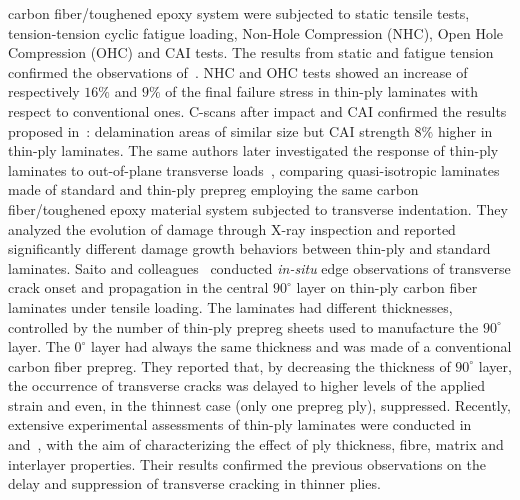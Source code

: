 carbon fiber/toughened epoxy system were subjected to static tensile tests, tension-tension cyclic fatigue loading, Non-Hole Compression (NHC), Open Hole Compression (OHC) and CAI tests. The results from static and fatigue tension confirmed the observations of~\cite{Sihn2007}. NHC and OHC tests showed an increase of respectively $16\%$ and $9\%$ of the final failure stress in thin-ply laminates with respect to conventional ones. C-scans after impact and CAI confirmed the results proposed in~\cite{Sihn2007}: delamination areas of similar size but CAI strength $8\%$ higher in thin-ply laminates. The same authors later investigated the response of thin-ply laminates to out-of-plane transverse loads~\cite{Yokozeki2010}, comparing quasi-isotropic laminates made of standard and thin-ply prepreg employing the same carbon fiber/toughened epoxy material system subjected to transverse indentation. They analyzed the evolution of damage through X-ray inspection and reported significantly different damage growth behaviors between thin-ply and standard laminates. Saito and colleagues~\cite{Saito2012} conducted \emph{in-situ} edge observations of transverse crack onset and propagation in the central $90^{\circ}$ layer on thin-ply carbon fiber laminates under tensile loading. The laminates had different thicknesses, controlled by the number of thin-ply prepreg sheets used to manufacture the $90^{\circ}$ layer. The $0^{\circ}$ layer had always the same thickness and was made of a conventional carbon fiber prepreg. They reported that, by decreasing the thickness of $90^{\circ}$ layer, the occurrence of transverse cracks was delayed to higher levels of the applied strain and even, in the thinnest case (only one prepreg ply), suppressed. Recently, extensive experimental assessments of thin-ply laminates were conducted in~\cite{Amacher2014} and~\cite{Cugnoni2018}, with the aim of characterizing the effect of ply thickness, fibre, matrix and interlayer properties. Their results confirmed the previous observations on the delay and suppression of transverse cracking in thinner plies.\\
